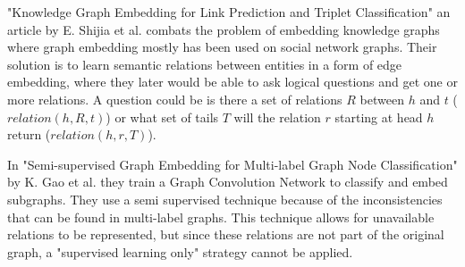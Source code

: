 "Knowledge Graph Embedding for Link Prediction and Triplet Classification" an article by E. Shijia et al. \cite{10.1007/978-981-10-3168-7_23} combats the problem of embedding knowledge graphs where graph embedding mostly has been used on social network graphs. Their solution is to learn semantic relations between entities in a form of edge embedding, where they later would be able to ask logical questions and get one or more relations. A question could be is there a set of relations $R$ between $h$ and $t$ ($relation(h,R,t)$) or what set of tails $T$ will the relation $r$ starting at head $h$ return ($relation(h,r,T)$).

In "Semi-supervised Graph Embedding for Multi-label Graph Node Classification" by K. Gao et al.\cite{10.1007/978-3-030-34223-4_35} they train a Graph Convolution Network to classify and embed subgraphs. They use a semi supervised technique because of the inconsistencies that can be found in multi-label graphs. This technique allows for unavailable relations to be represented, but since these relations are not part of the original graph, a "supervised learning only" strategy cannot be applied.
